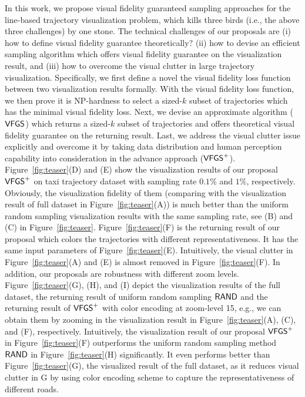 In this work, we propose visual fidelity guaranteed sampling approaches for the line-based trajectory visualization problem,
which kills three birds (i.e., the above three challenges) by one stone.
The technical challenges of our proposals are
(i) how to define visual fidelity guarantee theoretically?
(ii) how to devise an efficient sampling algorithm which offers visual fidelity guarantee on the visualization result,
and (iii) how to overcome the visual clutter in large trajectory visualization.
Specifically, we first define a novel the visual fidelity loss function between two visualization results formally.
With the visual fidelity loss function, we then prove it is NP-hardness to select a sized-$k$ subset of trajectories which has the minimal visual fidelity loss.
Next, we devise an approximate algorithm ($\mathsf{VFGS}$) which returns a sized-$k$ subset of trajectories and offers theoretical visual fidelity guarantee on the returning result.
Last, we address the visual clutter issue explicitly and overcome it by taking data distribution and human perception capability into consideration in the advance approach ($\mathsf{VFGS}^{+}$).
Figure~\ref{fig:teaser}(D) and (E) show the visualization results of our proposal $\mathsf{VFGS}^{+}{}$ on \pt{} taxi trajectory dataset with sampling rate $0.1\%$ and $1\%$, respectively.
Obviously, the visualization fidelity of them (comparing with the visualization result of full dataset in Figure~\ref{fig:teaser}(A)) is much better than
the uniform random sampling visualization results with the same sampling rate, see (B) and (C) in Figure~\ref{fig:teaser}.
Figure~\ref{fig:teaser}(F) is the returning result of our proposal which colors the trajectories with different representativeness.
It has the same input parameters of Figure~\ref{fig:teaser}(E).
Intuitively, the visual clutter in Figure~\ref{fig:teaser}(A) and (E) is almost removed in Figure~\ref{fig:teaser}(F).
In addition, our proposals are robustness with different zoom levels.
Figure~\ref{fig:teaser}(G), (H), and (I) depict the visualization results of the full \pt{} dataset, the returning result of uniform random sampling $\mathsf{RAND}$ and the returning result of $\mathsf{VFGS}^{+}$ with color encoding at zoom-level 15, e.g., we can obtain them by zooming in the visualization result in Figure~\ref{fig:teaser}(A), (C), and (F), respectively.
Intuitively, the visualization result of our proposal $\mathsf{VFGS}^{+}$ in Figure~\ref{fig:teaser}(F) outperforms the uniform random sampling method $\mathsf{RAND}$ in Figure~\ref{fig:teaser}(H) significantly.
It even performs better than Figure~\ref{fig:teaser}(G), the visualized result of the full dataset, as it reduces visual clutter in G by using color encoding scheme to capture the representativeness of different roads.


